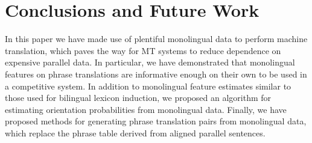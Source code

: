 \documentclass[11pt]{article}
\begin{document}




\section{Conclusions and Future Work} \label{sect:conc}



In this paper we have made use of plentiful monolingual data to perform machine translation, which paves the way for MT systems to reduce dependence on expensive parallel data.  In particular, we have demonstrated that monolingual features on phrase translations are informative enough on their own to be used in a competitive system. In addition to monolingual feature estimates similar to those used for bilingual lexicon induction, we proposed an algorithm for estimating orientation probabilities from monolingual data. Finally, we have proposed methods for generating phrase translation pairs from monolingual data, which replace the phrase table derived from aligned parallel sentences.

\end{document}
